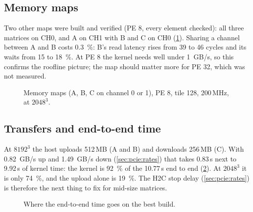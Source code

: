 \subsection{Memory maps}
\label{sec:eval:maps}
Two other maps were built and verified (PE 8, every element checked): all three matrices on CH0, and A on CH1
with B and C on CH0 (\cref{fig:memmap_plot}). Sharing a channel between A and B costs \SI{0.3}{\percent}: B's read
latency rises from 39 to 46 cycles and its waits from 15 to \SI{18}{\percent}. At PE 8 the kernel needs well under
\SI{1}{GB/s}, so this confirms the roofline picture; the map should matter more for PE 32, which was not measured.

\begin{figure}[ht]
  \centering
  
  \caption{Memory maps (A, B, C on channel 0 or 1), PE 8, tile 128, 200\,MHz, at \(2048^3\).}
  \label{fig:memmap_plot}
\end{figure}

\subsection{Transfers and end-to-end time}
\label{sec:eval:e2e}
At \(8192^3\) the host uploads 512\,MB (A and B) and downloads 256\,MB (C). With \SI{0.82}{GB/s} up and
\SI{1.49}{GB/s} down (\cref{sec:pcie:rates}) that takes 0.83\,s next to 9.92\,s of kernel time: the kernel is
\SI{92}{\percent} of the 10.77\,s end to end (\cref{fig:e2e}). At \(2048^3\) it is only \SI{74}{\percent}, and the
upload alone is \SI{19}{\percent}. The H2C stop delay (\cref{sec:pcie:rates}) is therefore the next thing to fix for
mid-size matrices.

\begin{figure}[ht]
  \centering
  
  \caption{Where the end-to-end time goes on the best build.}
  \label{fig:e2e}
\end{figure}
